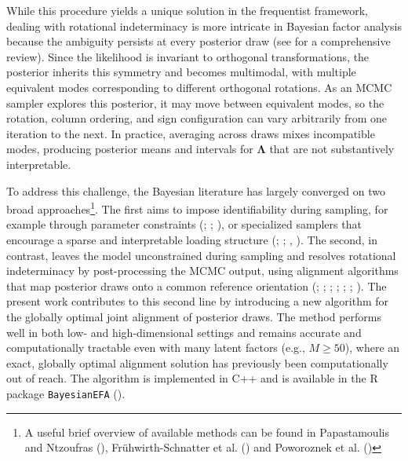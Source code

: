 \documentclass[
  man,
  longtable,
  nolmodern,
  notxfonts,
  notimes,
  colorlinks=true,linkcolor=blue,citecolor=blue,urlcolor=blue]{apa7}
\theoremstyle{plain}
\theoremstyle{plain}
\theoremstyle{remark}
\begin{document}
While this procedure yields a unique solution in the frequentist
framework, dealing with rotational indeterminacy is more intricate in
Bayesian factor analysis because the ambiguity persists at every
posterior draw (see
 for a comprehensive review). Since the likelihood is
invariant to orthogonal transformations, the posterior inherits this
symmetry and becomes multimodal, with multiple equivalent modes
corresponding to different orthogonal rotations. As an MCMC sampler
explores this posterior, it may move between equivalent modes, so the
rotation, column ordering, and sign configuration can vary arbitrarily
from one iteration to the next. In practice, averaging across draws
mixes incompatible modes, producing posterior means and intervals for
\(\mathbf\Lambda\) that are not substantively interpretable.

To address this challenge, the Bayesian literature has largely converged
on two broad approaches\footnote{A useful brief overview of available
  methods can be found in Papastamoulis and Ntzoufras
  (),
  Frühwirth-Schnatter et al.
  () and Poworoznek et
  al. ()}. The first aims to impose
identifiability during sampling, for example through parameter
constraints (;
;
), or
specialized samplers that encourage a sparse and interpretable loading
structure (;
;
,
). The second, in
contrast, leaves the model unconstrained during sampling and resolves
rotational indeterminacy by post-processing the MCMC output, using
alignment algorithms that map posterior draws onto a common reference
orientation (;
;
;
;
;
; ). The present work contributes to this second line by introducing
a new algorithm for the globally optimal joint alignment of posterior
draws. The method performs well in both low- and high-dimensional
settings and remains accurate and computationally tractable even with
many latent factors (e.g., \(M\geq 50\)), where an exact, globally
optimal alignment solution has previously been computationally out of
reach. The algorithm is implemented in C++ and is available in the R
package \texttt{BayesianEFA} ().
\end{document}
